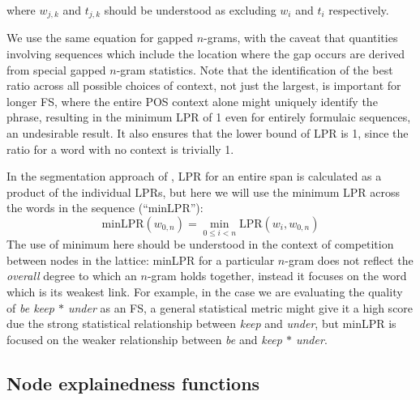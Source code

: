 \documentclass[11pt,letterpaper]{article}
\newcommand{\gap}{$*$\xspace}
\newcommand{\ex}[1]{\textit{#1}\xspace}
\newcommand{\LPR}{\ensuremath{\text{LPR}}}
\newcommand{\minLPR}{\ensuremath{\text{minLPR}}}
\begin{document}
\noindent
where $w_{j,k}$ and $t_{j,k}$ should be understood as excluding $w_{i}$ and $t_{i}$ respectively. 

We use the same equation for gapped $n$-grams, with the caveat that quantities involving sequences which include the location where the gap occurs are derived from special gapped $n$-gram statistics. Note that the identification of the best ratio across all possible choices of context, not just the largest, is important for longer FS, where the entire POS context alone might uniquely identify the phrase, resulting in the minimum LPR of 1 even for entirely formulaic sequences, an undesirable result. 
It also ensures that the lower bound of LPR is 1, since the ratio for a word with no context is trivially 1.

In the segmentation approach of , LPR for an entire span is calculated as a product of the individual LPRs, but here we will use the minimum LPR across the words in the sequence (``\minLPR''):
\begin{displaymath}
\minLPR(w_{0,n}) = \min_{0 \leq i < n }{\LPR(w_i,w_{0,n})}
\end{displaymath}
The use of minimum here should be understood in the context of competition between nodes in the lattice: minLPR for a particular $n$-gram does not reflect the \emph{overall} degree to which an $n$-gram holds together, instead it focuses on the word which is its weakest link. For example, in the case we are evaluating the quality of \ex{be keep \gap under} as an FS, a general statistical metric might give it a high score due the strong statistical relationship between \ex{keep} and \ex{under}, but minLPR is focused on the weaker relationship between \ex{be} and \ex{keep \gap under}.


\subsection{Node explainedness functions}
\end{document}
